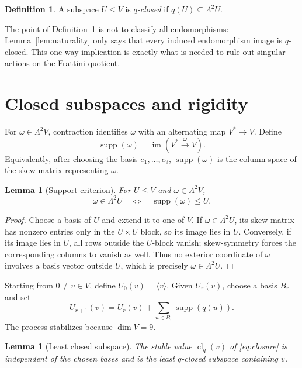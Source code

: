 \documentclass[11pt]{amsart}
\newtheorem{lemma}[theorem]{Lemma}
\theoremstyle{definition}
\newtheorem{definition}[theorem]{Definition}
\theoremstyle{remark}
\newcommand{\im}{\operatorname{im}}
\newcommand{\supp}{\operatorname{supp}}
\newcommand{\clq}{\operatorname{cl}_q}
\begin{document}
\begin{definition}\label{def:closed}
A subspace $U\leq V$ is \emph{$q$-closed} if
$q(U)\subseteq\Lambda^2U$.
\end{definition}

The point of Definition~\ref{def:closed} is not to classify all
endomorphisms: Lemma~\ref{lem:naturality} only says that every induced
endomorphism image is $q$-closed.  This one-way implication is exactly
what is needed to rule out singular actions on the Frattini quotient.

\section{Closed subspaces and rigidity}\label{sec:rigidity}

For $\omega\in\Lambda^2V$, contraction identifies $\omega$ with an
alternating map $V^*\to V$.  Define
\[
                    \supp(\omega)=\im(V^*\xrightarrow{\ \omega\ }V).
\]
Equivalently, after choosing the basis $e_1,\ldots,e_9$,
$\supp(\omega)$ is the column space of the skew matrix representing
$\omega$.

\begin{lemma}[Support criterion]\label{lem:support}
For $U\leq V$ and $\omega\in\Lambda^2V$,
\[
                \omega\in\Lambda^2U
       \quad\Longleftrightarrow\quad
                \supp(\omega)\leq U.
\]
\end{lemma}

\begin{proof}
Choose a basis of $U$ and extend it to one of $V$.  If
$\omega\in\Lambda^2U$, its skew matrix has nonzero entries only in the
$U\times U$ block, so its image lies in $U$.  Conversely, if its image
lies in $U$, all rows outside the $U$-block vanish; skew-symmetry forces
the corresponding columns to vanish as well.  Thus no exterior coordinate
of $\omega$ involves a basis vector outside $U$, which is precisely
$\omega\in\Lambda^2U$.
\end{proof}

Starting from $0\neq v\in V$, define $U_0(v)=\langle v\rangle$.  Given
$U_r(v)$, choose a basis $B_r$ and set
\begin{equation}\label{eq:closure}
 U_{r+1}(v)=U_r(v)+\sum_{u\in B_r}\supp(q(u)).
\end{equation}
The process stabilizes because $\dim V=9$.

\begin{lemma}[Least closed subspace]\label{lem:closure}
The stable value $\clq(v)$ of \eqref{eq:closure} is independent of the
chosen bases and is the least $q$-closed subspace containing $v$.
\end{lemma}
\end{document}
